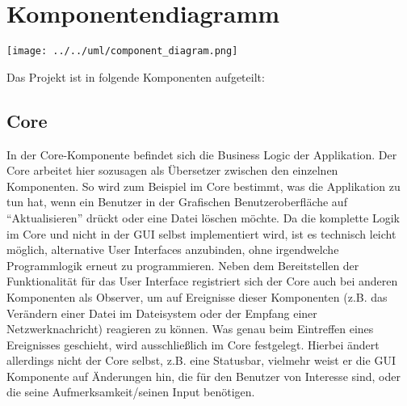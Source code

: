 \section{Komponentendiagramm}

\texttt{[image: ../../uml/component\_diagram.png]}

Das Projekt ist in folgende Komponenten aufgeteilt:





\subsection{Core}
In der Core-Komponente befindet sich die Business Logic der Applikation. Der Core arbeitet hier sozusagen als Übersetzer zwischen den einzelnen Komponenten. So wird zum Beispiel im Core bestimmt, was die Applikation zu tun hat, wenn ein Benutzer in der Grafischen Benutzeroberfläche auf ``Aktualisieren'' drückt oder eine Datei löschen möchte. Da die komplette Logik im Core und nicht in der GUI selbst implementiert wird, ist es technisch leicht möglich, alternative User Interfaces anzubinden, ohne irgendwelche Programmlogik erneut zu programmieren.
Neben dem Bereitstellen der Funktionalität für das User Interface registriert sich der Core auch bei anderen Komponenten als Observer, um auf Ereignisse dieser Komponenten (z.B. das Verändern einer Datei im Dateisystem oder der Empfang einer Netzwerknachricht) reagieren zu können. Was genau beim Eintreffen eines Ereignisses geschieht, wird ausschließlich im Core festgelegt. Hierbei ändert allerdings nicht der Core selbst, z.B. eine Statusbar, vielmehr weist er die GUI Komponente auf Änderungen hin, die für den Benutzer von Interesse sind, oder die seine Aufmerksamkeit/seinen Input benötigen.

